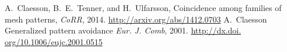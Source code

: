 \documentclass[11pt,a4paper]{article}
\newenvironment{talkBibliog}{\begin{thebibliography}{9}\small}{\end{thebibliography}}
\begin{document}

\begin{talkBibliog}
  A.~Claesson, B.~E.~Tenner, and H.~Ulfarsson,
  Coincidence among families of mesh patterns,
  \emph{CoRR}, 2014.
  \url{http://arxiv.org/abs/1412.0703}
 A.~Claesson
 \newblock Generalized pattern avoidance
 \emph{Eur. J. Comb}, 2001.
 \url{http://dx.doi. org/10.1006/eujc.2001.0515}
\end{talkBibliog}

\endgroup
\end{document}
